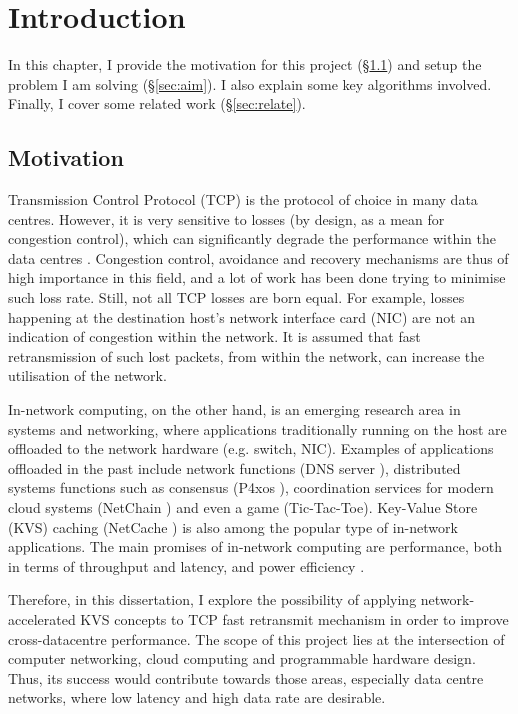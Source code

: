 \chapter{Introduction}
In this chapter, I provide the motivation for this project (\S\ref{sec:motive}) and setup the problem I am solving (\S\ref{sec:aim}). I also explain some key algorithms involved. Finally, I cover some related work (\S\ref{sec:relate}).
\section{Motivation}
\label{sec:motive}
Transmission Control Protocol (TCP) is the protocol of choice in many data centres. However, it is very sensitive to losses (by design, as a mean for congestion control), which can significantly degrade the performance within the data centres \cite{zilberman2017has}. Congestion control, avoidance and recovery mechanisms are thus of high importance in this field, and a lot of work has been done trying to minimise such loss rate. Still, not all TCP losses are born equal. For example, losses happening at the destination host’s network interface card (NIC) are not an indication of congestion within the network. It is assumed that fast retransmission of such lost packets, from within the network, can increase the utilisation of the network.

In-network computing, on the other hand, is an emerging research area in systems and networking, where applications traditionally running on the host are offloaded to the network hardware (e.g. switch, NIC). Examples of applications offloaded in the past include network functions (DNS server \cite{dns}), distributed systems functions such as consensus (P4xos \cite{p4xos, dang16}), coordination services for modern cloud systems (NetChain \cite{netChain}) and even a game (Tic-Tac-Toe). Key-Value Store (KVS) caching (NetCache \cite{netCache}) is also among the popular type of in-network applications. The main promises of in-network computing are performance, both in terms of throughput and latency, and power efficiency \cite{sigarch}.
  
Therefore, in this dissertation, I explore the possibility of applying network-accelerated KVS concepts to TCP fast retransmit mechanism in order to improve cross-datacentre performance. The scope of this project lies at the intersection of computer networking, cloud computing and programmable hardware design. Thus, its success would contribute towards those areas, especially data centre networks, where low latency and high data rate are desirable.

